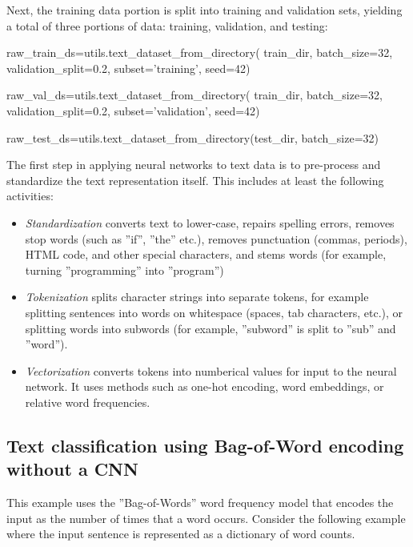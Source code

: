Next, the training data portion is split into training and validation sets, yielding a total of three portions of data: training, validation, and testing:

\begin{samepage}
\begin{pythoncode}
raw_train_ds=utils.text_dataset_from_directory(
    train_dir, batch_size=32, validation_split=0.2,
    subset='training', seed=42)

raw_val_ds=utils.text_dataset_from_directory(
    train_dir, batch_size=32, validation_split=0.2,
    subset='validation', seed=42)

raw_test_ds=utils.text_dataset_from_directory(test_dir, batch_size=32)
\end{pythoncode}
\end{samepage}

The first step in applying neural networks to text data is to pre-process and standardize the text representation itself. This includes at least the following activities:

\begin{itemize}
   \item \emph{Standardization} converts text to lower-case, repairs spelling errors, removes stop words (such as ''if'', ''the'' etc.), removes punctuation (commas, periods), HTML code, and other special characters, and stems words (for example, turning ''programming'' into ''program'')
   \item \emph{Tokenization} splits character strings into separate tokens, for example splitting sentences into words on whitespace (spaces, tab characters, etc.), or splitting words into subwords (for example, ''subword'' is split to ''sub'' and ''word'').
   \item \emph{Vectorization} converts tokens into numberical values for input to the neural network. It uses methods such as one-hot encoding, word embeddings, or relative word frequencies.
\end{itemize}

\subsection[Bag-ofWord encoding]{Text classification using Bag-of-Word encoding without a CNN}

This example uses the ''Bag-of-Words'' word frequency model that encodes the input as the number of times that a word occurs. Consider the following example where the input sentence is represented as a dictionary of word counts. 

